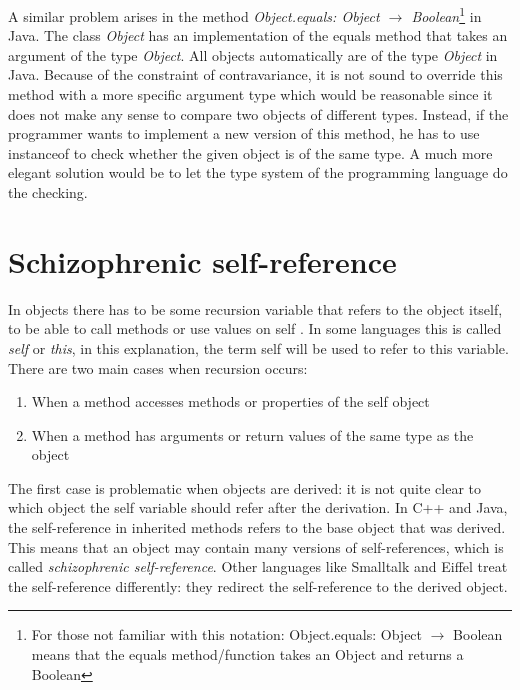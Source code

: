 A similar problem arises in the method \emph{Object.equals: Object
$\rightarrow$ Boolean}\footnote{For those not familiar with this
notation: Object.equals: Object $\rightarrow$ Boolean means that
the equals method/function takes an Object and returns a Boolean}
in Java. The class \emph{Object} has an implementation of the equals
method that takes an argument of the type \emph{Object}. All objects
automatically are of the type \emph{Object} in Java.  Because of the
constraint of contravariance, it is not sound to override this method
with a more specific argument type which would be reasonable since it does
not make any sense to compare two objects of different types. Instead,
if the programmer wants to implement a new version of this method, he
has to use instanceof to check whether the given object is of the same
type. A much more elegant solution would be to let the type system of
the programming language do the checking.\\

\section{Schizophrenic self-reference}
\label{sec:schizoReferences}

In objects there has to be some recursion variable that refers to the
object itself, to be able to call methods or use values on self . 
In some languages this is called \emph{self} or \emph{this}, in
this explanation, the term self will be used to refer to this variable. \\

There are two main cases when recursion occurs:
\begin{enumerate}
\item When a method accesses methods or properties of the self object
\item When a method has arguments or return values of the same type as the object
\end{enumerate}

The first case is problematic when objects are derived: it is not quite
clear to which object the self variable should refer after the derivation.
In C++ and Java, the self-reference in inherited methods refers to the
base object that was derived. This means that an object may contain
many versions of self-references, which is called \emph{schizophrenic
self-reference}. Other languages like Smalltalk and Eiffel treat the
self-reference differently: they redirect the self-reference to the
derived object. \\

